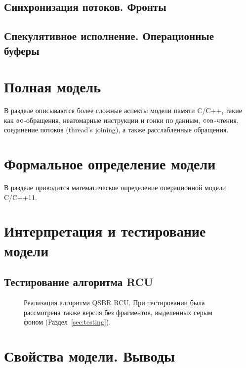 

\subsection{Синхронизация потоков. Фронты}
\subsection{Спекулятивное исполнение. Операционные буферы}

\section{Полная модель}
В разделе описываются более сложные аспекты модели памяти C/C++, такие как
${\mathtt{sc}}$-обращения, неатомарные инструкции и гонки по данным,
${\mathtt{con}}$-чтения, соединение потоков (thread's joining),
а также расслабленные обращения.

\section{Формальное определение модели}
В разделе приводится математическое определение операционной модели C/C++11.

\section{Интерпретация и тестирование модели}

\subsection{Тестирование алгоритма RCU}



\begin{figure*}[t]

\caption[Реализация алгоритма QSBR RCU]
{Реализация алгоритма QSBR RCU.
 При тестировании была рассмотрена также версия без фрагментов, выделенных серым фоном
 (Раздел~\ref{sec:testing}).}
\label{fig:rcuProg}
\end{figure*}

\section{Свойства модели. Выводы}
